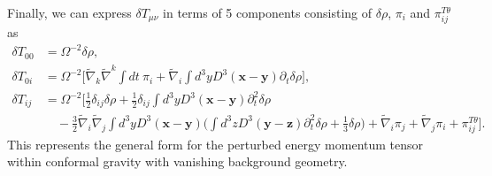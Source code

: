 \documentclass[10pt,letterpaper]{article}
\begin{document}
Finally, we can express $\delta T_{\mu\nu}$ in terms of 5 components consisting of $\delta \rho$, $\pi_i$ and $\pi_{ij}^{T\theta}$ as
\begin{align}
\delta T_{00}  &= \Omega^{-2} \delta \rho,
\nonumber\\	
\delta T_{0i} &= \Omega^{-2} \bigg[ \tilde\nabla_k \tilde\nabla^k \int dt\  \pi_i  + \tilde\nabla_i  \int d^3y D^3(\mathbf x-\mathbf y) \partial_t \delta \rho\bigg],
\nonumber\\	
\delta T_{ij}  &= \Omega^{-2}\bigg[ 
\frac12 \delta_{ij} \delta\rho + \frac12 \delta_{ij} \int d^3y D^3(\mathbf x-\mathbf y) \partial_t^2 \delta \rho \nonumber\\
&\quad -\frac32 \tilde\nabla_i\tilde\nabla_j \int d^3y D^3(\mathbf x-\mathbf y) \bigg( \int d^3z D^3(\mathbf y-\mathbf z) \partial_t^2 \delta \rho + \frac13\delta\rho\bigg)
+ \tilde\nabla_i \pi_j + \tilde\nabla_j \pi_i + \pi_{ij}^{T\theta}\bigg].
\end{align}
This represents the general form for the perturbed energy momentum tensor within conformal gravity with vanishing background geometry. 
\end{document}
